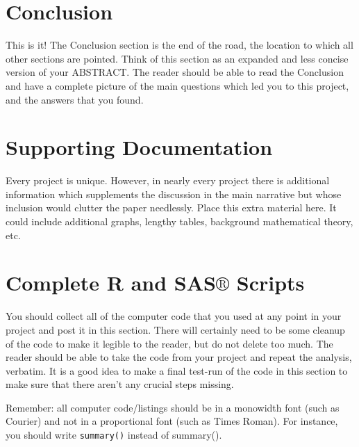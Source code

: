 \documentclass[11pt]{article}
\begin{document}
\newpage

\section[Conclusion]{Conclusion}
\label{sec-6}

This is it! The Conclusion section is the end of the road, the
location to which all other sections are pointed. Think of this
section as an expanded and less concise version of your ABSTRACT.  The
reader should be able to read the Conclusion and have a complete
picture of the main questions which led you to this project, and the
answers that you found.

\newpage
\appendix
{}
{}



\newpage

\section[Supporting Documentation]{Supporting Documentation}
\label{sec-7}

Every project is unique. However, in nearly every project there is
additional information which supplements the discussion in the main
narrative but whose inclusion would clutter the paper
needlessly. Place this extra material here. It could include
additional graphs, lengthy tables, background mathematical theory,
etc.

\newpage

\section[Complete R and SAS\(\circledR\) Scripts]{Complete R and SAS\(\circledR\) Scripts}
\label{sec-8}

You should collect all of the computer code that you used at any point
in your project and post it in this section. There will certainly need
to be some cleanup of the code to make it legible to the reader, but
do not delete too much. The reader should be able to take the code
from your project and repeat the analysis, verbatim. It is a good idea
to make a final test-run of the code in this section to make sure that
there aren't any crucial steps missing.

Remember: all computer code/listings should be in a monowidth font
(such as Courier) and not in a proportional font (such as Times
Roman). For instance, you should write \texttt{summary()} instead of
summary().
\end{document}
